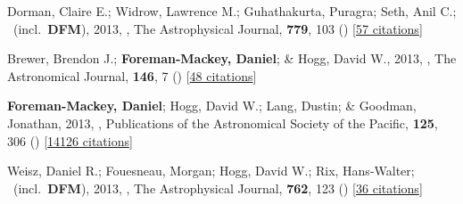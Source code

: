 \item[{\color{numcolor}\scriptsize4}] Dorman, Claire E.; Widrow, Lawrence M.; Guhathakurta, Puragra; Seth, Anil C.; \etal\ (incl.\ \textbf{DFM}), 2013, , The Astrophysical Journal, \textbf{779}, 103 () [\href{https://ui.adsabs.harvard.edu/abs/2013ApJ...779..103D}{57 citations}]

\item[{\color{numcolor}\scriptsize3}] Brewer, Brendon J.; \textbf{Foreman-Mackey, Daniel}; \& Hogg, David W., 2013, , The Astronomical Journal, \textbf{146}, 7 () [\href{https://ui.adsabs.harvard.edu/abs/2013AJ....146....7B}{48 citations}]

\item[{\color{numcolor}\scriptsize2}] \textbf{Foreman-Mackey, Daniel}; Hogg, David W.; Lang, Dustin; \& Goodman, Jonathan, 2013, , Publications of the Astronomical Society of the Pacific, \textbf{125}, 306 () [\href{https://ui.adsabs.harvard.edu/abs/2013PASP..125..306F}{14126 citations}]

\item[{\color{numcolor}\scriptsize1}] Weisz, Daniel R.; Fouesneau, Morgan; Hogg, David W.; Rix, Hans-Walter; \etal\ (incl.\ \textbf{DFM}), 2013, , The Astrophysical Journal, \textbf{762}, 123 () [\href{https://ui.adsabs.harvard.edu/abs/2013ApJ...762..123W}{36 citations}]